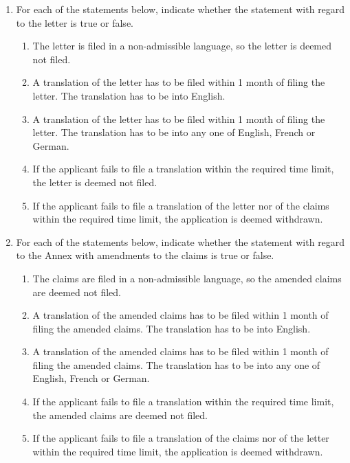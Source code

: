 \documentclass{report}
\begin{document}
\begin{enumerate}[label=\textbf{Question \arabic*}]
\begin{enumerate}[label=\textbf{Question \arabic*}]
    \begin{enumerate}[label=(\alph*)]
        \item For each of the statements below, indicate whether the statement with regard to the letter is true or false.
        \begin{enumerate}[label={(\alph{enumi}.\arabic*)}]
            \item The letter is filed in a non-admissible language, so the letter is deemed not filed.
            \item A translation of the letter has to be filed within 1 month of filing the letter. The translation has to be into English.
            \item A translation of the letter has to be filed within 1 month of filing the letter. The translation has to be into any one of English, French or German.
            \item If the applicant fails to file a translation within the required time limit, the letter is deemed not filed.
            \item If the applicant fails to file a translation of the letter nor of the claims within the required time limit, the application is deemed withdrawn.
        \end{enumerate}
        
        \item For each of the statements below, indicate whether the statement with regard to the Annex with amendments to the claims is true or false.
        \begin{enumerate}[label={(\alph{enumi}.\arabic*)}]
            \item The claims are filed in a non-admissible language, so the amended claims are deemed not filed.
            \item A translation of the amended claims has to be filed within 1 month of filing the amended claims. The translation has to be into English.
            \item A translation of the amended claims has to be filed within 1 month of filing the amended claims. The translation has to be into any one of English, French or German.
            \item If the applicant fails to file a translation within the required time limit, the amended claims are deemed not filed.
            \item If the applicant fails to file a translation of the claims nor of the letter within the required time limit, the application is deemed withdrawn.
        \end{enumerate}
        

\end{enumerate}
\end{enumerate}
\end{enumerate}
\end{document}
